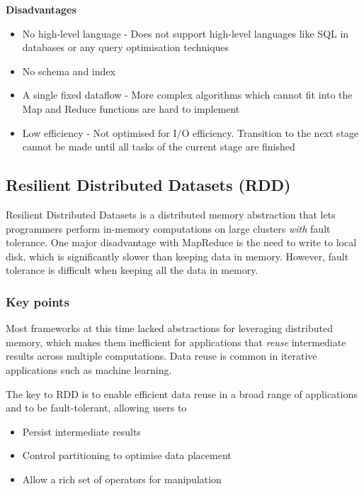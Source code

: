 \documentclass{sty/SizheArticle}
\begin{document}
\textbf{Disadvantages}
\begin{itemize}
\item No high-level language - Does not support high-level languages like SQL in
databases or any query optimisation techniques
\item No schema and index
\item A single fixed dataflow - More complex algorithms which cannot fit into
the Map and Reduce functions are hard to implement
\item Low efficiency - Not optimised for I/O efficiency. Transition to the next
stage cannot be made until all tasks of the current stage are finished
\end{itemize}

\subsection{Resilient Distributed Datasets (RDD)}
Resilient Distributed Datasets is a distributed memory abstraction that lets
programmers perform in-memory computations on large clusters \textit{with}
fault tolerance. One major disadvantage with MapReduce is the need to write
to local disk, which is significantly slower than keeping data in memory.
However, fault tolerance is difficult when keeping all the data in memory.


\subsubsection{Key points}
Most frameworks at this time lacked abstractions for leveraging distributed
memory, which makes them inefficient for applications that \textit{reuse}
intermediate results across multiple computations. Data reuse is common
in iterative applications such as machine learning.

The key to RDD is to enable efficient data reuse in a broad range of applications
and to be fault-tolerant, allowing users to
\begin{itemize}
\item Persist intermediate results
\item Control partitioning to optimise data placement
\item Allow a rich set of operators for manipulation
\end{itemize}
\end{document}
